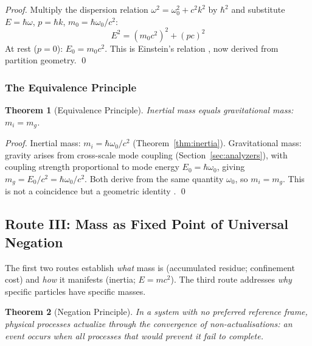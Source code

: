 \documentclass[twocolumn,10pt,a4paper]{article}
\newtheorem{theorem}{Theorem}[section]
\theoremstyle{definition}
\theoremstyle{remark}
\begin{document}
\begin{proof}
Multiply the dispersion relation $\omega^2 = \omega_0^2 + c^2k^2$ by $\hbar^2$ and substitute $E = \hbar\omega$, $p = \hbar k$, $m_0 = \hbar\omega_0/c^2$:
\begin{equation}
    E^2 = (m_0c^2)^2 + (pc)^2
\end{equation}
At rest ($p = 0$): $E_0 = m_0c^2$. This is Einstein's relation \citep{einstein1905a}, now derived from partition geometry. \qed
\end{proof}

\subsubsection{The Equivalence Principle}

\begin{theorem}[Equivalence Principle]
\label{thm:equivalence}
Inertial mass equals gravitational mass: $m_i = m_g$.
\end{theorem}

\begin{proof}
Inertial mass: $m_i = \hbar\omega_0/c^2$ (Theorem~\ref{thm:inertia}). Gravitational mass: gravity arises from cross-scale mode coupling (Section~\ref{sec:analyzers}), with coupling strength proportional to mode energy $E_0 = \hbar\omega_0$, giving $m_g = E_0/c^2 = \hbar\omega_0/c^2$. Both derive from the same quantity $\omega_0$, so $m_i = m_g$. This is not a coincidence but a geometric identity \citep{eotvos1922,schlamminger2008}. \qed
\end{proof}

\subsection{Route III: Mass as Fixed Point of Universal Negation}

The first two routes establish \emph{what} mass is (accumulated residue; confinement cost) and \emph{how} it manifests (inertia; $E = mc^2$). The third route addresses \emph{why} specific particles have specific masses.

\begin{theorem}[Negation Principle]
\label{thm:negation}
In a system with no preferred reference frame, physical processes actualize through the convergence of non-actualisations: an event occurs when all processes that would prevent it fail to complete.
\end{theorem}
\end{document}
